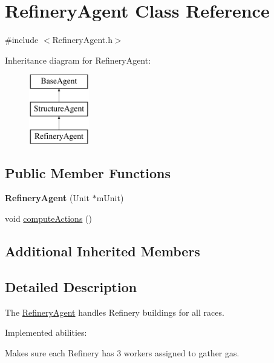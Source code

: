 \hypertarget{class_refinery_agent}{\section{Refinery\-Agent Class Reference}
\label{class_refinery_agent}
}


{\ttfamily \#include $<$Refinery\-Agent.\-h$>$}

Inheritance diagram for Refinery\-Agent\-:\begin{figure}[H]
\begin{center}
\leavevmode
\includegraphics[height=3.000000cm]{class_refinery_agent}
\end{center}
\end{figure}
\subsection*{Public Member Functions}
\begin{DoxyCompactItemize}
\item 
\hypertarget{class_refinery_agent_aab69f209929bfda91b00e8fbb9d0ffab}{{\bfseries Refinery\-Agent} (Unit $\ast$m\-Unit)}\label{class_refinery_agent_aab69f209929bfda91b00e8fbb9d0ffab}

\item 
void \hyperlink{class_refinery_agent_af4ea866916e13e258f9df2ff6167cb5e}{compute\-Actions} ()
\end{DoxyCompactItemize}
\subsection*{Additional Inherited Members}


\subsection{Detailed Description}
The \hyperlink{class_refinery_agent}{Refinery\-Agent} handles Refinery buildings for all races.

Implemented abilities\-:
\begin{DoxyItemize}
\item Makes sure each Refinery has 3 workers assigned to gather gas.
\end{DoxyItemize}

